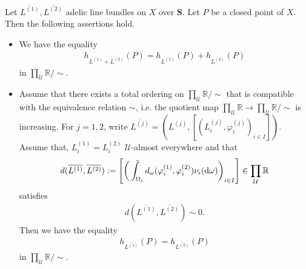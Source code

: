 \documentclass [11pt,reqno]{amsart}
\def\bR{{\mathbb{R}}}
\newcommand{\1}{\mathmybb{1}}
\def\cU{{\mathcal{U}}}
\def\diff{\mathrm{d}}
\def\upint{\mathchoice%
    {\mkern13mu\overline{\vphantom{\intop}\mkern7mu}\mkern-20mu}%
    {\mkern7mu\overline{\vphantom{\intop}\mkern7mu}\mkern-14mu}%
    {\mkern7mu\overline{\vphantom{\intop}\mkern7mu}\mkern-14mu}%
    {\mkern7mu\overline{\vphantom{\intop}\mkern7mu}\mkern-14mu}%
  \int}
\begin{document}
\begin{theorem}
\label{th:height_of_closed_points_families}
Let $\overline{L^{(1)}}, \overline{L^{(2)}}$ adelic line bundles on $X$ over $\mathbf{S}$. Let $P$ be a closed point of $X$. Then the following assertions hold.
\begin{itemize}
	\item[(1)] We have the equality
	\begin{align*}
	h_{\overline{L^{(1)}}+\overline{L^{(2)}}}(P) = h_{\overline{L^{(1)}}}(P) + h_{\overline{L^{(2)}}}(P)
	\end{align*}
	in $\prod_{\cU}\bR/\sim$.
	\item[(2)] Assume that there exists a total ordering on $\prod_{\cU}\bR/\sim$ that is compatible with the equivalence relation $\sim$, i.e. the quotient map $\prod_{\cU}\bR \to \prod_{\cU}\bR/\sim$ is increasing. For $j=1,2$, write $\overline{L^{(j)}}=(L^{(j)},[(L^{(j)}_{i},\varphi^{(j)}_{i})_{i\in I}])$. Assume that, $L_{i}^{(1)}=L_{i}^{(2)}$ $\cU$-almost everywhere and that
	\begin{align*}
	d(\overline{L^{(1)}},\overline{L^{(2)}}) :=  \left[\left(\upint_{\Omega_i} d_{\omega}(\varphi^{(1)}_{i},\varphi^{(2)}_{i})\nu_i(\diff\omega)\right)_{i\in I}\right] \in \displaystyle\prod_{\cU}\bR
	\end{align*}
	satisfies 
	\begin{align*}
	d(\overline{L^{(1)}},\overline{L^{(2)}}) \sim 0.
	\end{align*}
	Then we have the equality 
	\begin{align*}
	h_{\overline{L^{(1)}}}(P) = h_{\overline{L^{(2)}}}(P)
	\end{align*}
	in $\prod_{\cU}\bR/\sim$.
\end{itemize}
\end{theorem}
\end{document}
